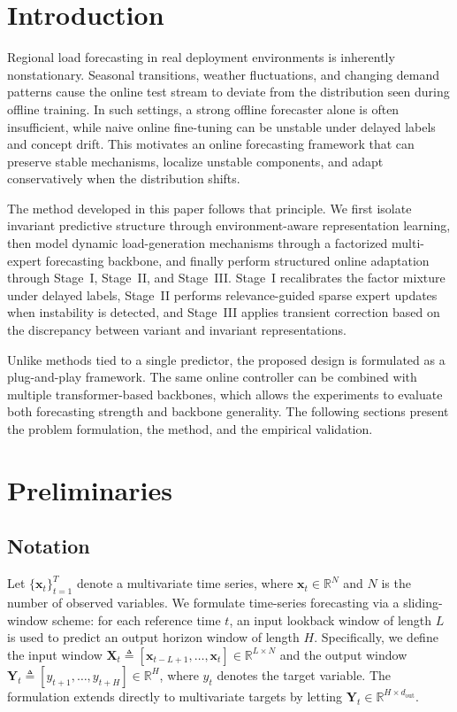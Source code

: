 ﻿\documentclass[journal]{IEEEtran}
\newenvironment{auditproblemblock}{\begingroup\color{red}}{\endgroup}
\begin{document}
\section{Introduction}
\begin{auditproblemblock}
Regional load forecasting in real deployment environments is inherently nonstationary. Seasonal transitions, weather fluctuations, and changing demand patterns cause the online test stream to deviate from the distribution seen during offline training. In such settings, a strong offline forecaster alone is often insufficient, while naive online fine-tuning can be unstable under delayed labels and concept drift. This motivates an online forecasting framework that can preserve stable mechanisms, localize unstable components, and adapt conservatively when the distribution shifts.

The method developed in this paper follows that principle. We first isolate invariant predictive structure through environment-aware representation learning, then model dynamic load-generation mechanisms through a factorized multi-expert forecasting backbone, and finally perform structured online adaptation through Stage~I, Stage~II, and Stage~III. Stage~I recalibrates the factor mixture under delayed labels, Stage~II performs relevance-guided sparse expert updates when instability is detected, and Stage~III applies transient correction based on the discrepancy between variant and invariant representations.

Unlike methods tied to a single predictor, the proposed design is formulated as a plug-and-play framework. The same online controller can be combined with multiple transformer-based backbones, which allows the experiments to evaluate both forecasting strength and backbone generality. The following sections present the problem formulation, the method, and the empirical validation.
\end{auditproblemblock}

\section{Preliminaries}
\subsection{Notation}
Let $\{\mathbf{x}_t\}_{t=1}^{T}$ denote a multivariate time series, where $\mathbf{x}_t \in \mathbb{R}^{N}$ and $N$ is the number of observed variables. We formulate time-series forecasting via a sliding-window scheme: for each reference time $t$, an input lookback window of length $L$ is used to predict an output horizon window of length $H$. Specifically, we define the input window $\mathbf{X}_t \triangleq [\mathbf{x}_{t-L+1},\ldots,\mathbf{x}_t] \in \mathbb{R}^{L \times N}$ and the output window $\mathbf{Y}_t \triangleq [y_{t+1},\ldots,y_{t+H}] \in \mathbb{R}^{H}$, where $y_t$ denotes the target variable. The formulation extends directly to multivariate targets by letting $\mathbf{Y}_t \in \mathbb{R}^{H \times d_{\mathrm{out}}}$.
\end{document}
